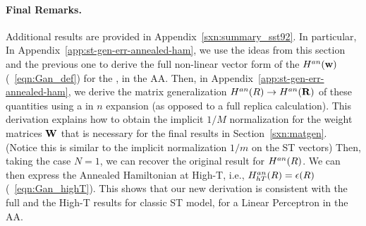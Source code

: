 \paragraph{Final Remarks.}
Additional results are provided in Appendix~\ref{sxn:summary_sst92}. In particular, 
In Appendix~\ref{app:st-gen-err-annealed-ham}, we use the ideas from this section  and the previous one to derive the full non-linear vector form of the \AnnealedHamiltonian $H^{an}({\mathbf{w}})$ (\EQN~\ref{eqn:Gan_def})
for the \LinearPerceptron, in the AA.
Then, in Appendix~\ref{app:st-gen-err-annealed-ham}, we derive the matrix generalization
$H^{an}(R)\rightarrow H^{an}(\mathbf{R})$ of these quantities using
a \LargeN in $n$ expansion (as opposed to a full replica calculation).
This derivation explains how to obtain the implicit $1/M$ normalization for
the weight matrices ${\mathbf{W}}$ that is necessary for the final results in Section~\ref{sxn:matgen}.
(Notice this is similar to the implicit normalization $1/m$ on the ST vectors)
Then, taking the case $N=1$, we can recover the original result for $H^{an}(R)$.
We can then express the Annealed Hamiltonian at High-T, i.e.,
$H^{an}_{hT}(R)=\epsilon(R)$ (\EQN~\ref{eqn:Gan_highT}).
This shows that  our new derivation is consistent with the full  and the High-T results for
classic ST \Perceptron model, for a Linear Perceptron in the AA.~\cite{SST92}


